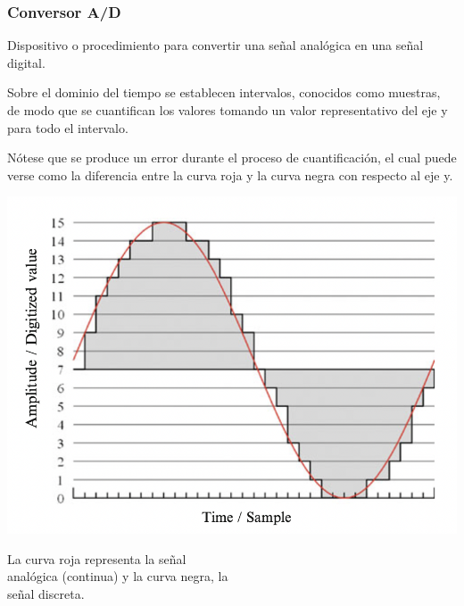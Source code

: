 \documentclass[
10pt, %
aspectratio=169, %
]{beamer}
\begin{document}
	\begin{frame}
		
		\frametitle{Conversor A/D}
		
		\begin{alertblock}{}
			Dispositivo o procedimiento para convertir una señal analógica en una señal digital.
		\end{alertblock}
		
		\begin{minipage}{.5\textwidth}
			
			Sobre el dominio del tiempo se establecen intervalos, conocidos como muestras, de modo que se cuantifican los valores tomando un valor representativo del eje y para todo el intervalo. 
			
			\vspace{1\baselineskip}
			Nótese que se produce un error durante el proceso de cuantificación, el cual puede verse como la diferencia entre la curva roja y la curva negra con respecto al eje y.
			
		\end{minipage}%
		\begin{minipage}{.6\textwidth}
			
			\centering
			\includegraphics[scale=0.4]{ad.png}
			
			La curva roja representa la señal \\analógica (continua) y la curva negra, la \\señal discreta.
			
		\end{minipage}%
		

\end{frame}
\end{document}
